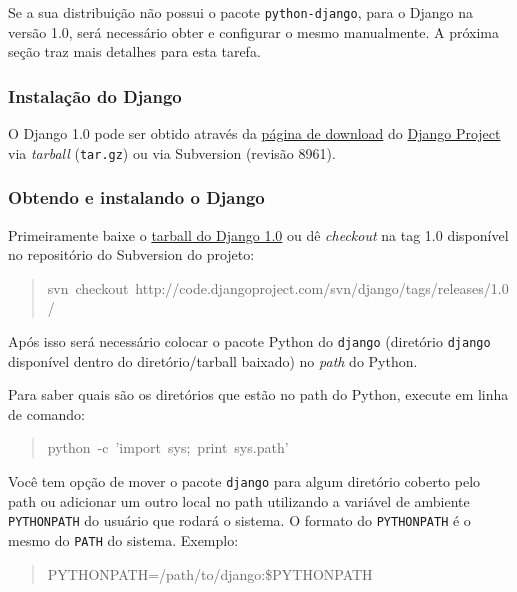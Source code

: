 Se a sua distribuição não possui o pacote \texttt{python-django}, para
o Django na versão 1.0, será necessário obter e configurar o mesmo
manualmente. A próxima seção traz mais detalhes para esta tarefa.



\hypertarget{instala-o-do-django}{}
\subsubsection*{Instalação do Django}
O Django 1.0 pode ser obtido através da \href{http://www.djangoproject.com/download/}{página de download} do \href{http://www.djangoproject.com}{Django Project} via \emph{tarball} (\texttt{tar.gz}) ou via
Subversion (revisão 8961).



\hypertarget{obtendo-e-instalando-o-django}{}
\subsubsection*{Obtendo e instalando o Django}
Primeiramente baixe o \href{http://www.djangoproject.com/download/1.0/tarball/}{tarball do Django 1.0} ou dê
\emph{checkout} na tag 1.0 disponível no repositório do Subversion do
projeto:
\begin{quote}{\ttfamily \raggedright \noindent
svn~checkout~http://code.djangoproject.com/svn/django/tags/releases/1.0/
}\end{quote}

Após isso será necessário colocar o pacote Python do \texttt{django}
(diretório \texttt{django} disponível dentro do diretório/tarball baixado)
no \emph{path} do Python.

Para saber quais são os diretórios que estão no path do Python,
execute em linha de comando:
\begin{quote}{\ttfamily \raggedright \noindent
python~-c~'import~sys;~print~sys.path'
}\end{quote}

Você tem opção de mover o pacote \texttt{django} para algum diretório
coberto pelo path ou adicionar um outro local no path utilizando a
variável de ambiente \texttt{PYTHONPATH} do usuário que rodará o sistema. O
formato do \texttt{PYTHONPATH} é o mesmo do \texttt{PATH} do sistema. Exemplo:
\begin{quote}{\ttfamily \raggedright \noindent
PYTHONPATH=/path/to/django:{\$}PYTHONPATH
}\end{quote}

